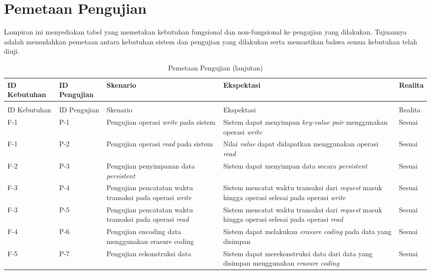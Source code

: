 \chapter{Pemetaan Pengujian}
\label{appendix:pemetaan-pengujian}

Lampiran ini menyediakan tabel yang memetakan kebutuhan fungsional dan non-fungsional ke pengujian yang dilakukan. Tujuannya adalah memudahkan pemetaan antara kebutuhan sistem dan pengujian yang dilakukan serta memastikan bahwa semua kebutuhan telah diuji.

\begin{longtable}{|l|l|p{3cm}|p{3cm}|l|}
\caption{Pemetaan Pengujian}
\label{tab:pemetaan-pengujian} \\
\hline
\rowcolor{black!10} ID Kebutuhan & ID Pengujian & Skenario & Ekspektasi & Realita \\ \hline
\endfirsthead

\caption[]{Pemetaan Pengujian (lanjutan)} \\
\hline
\rowcolor{black!10} ID Kebutuhan & ID Pengujian & Skenario & Ekspektasi & Realita \\ \hline
\endhead

F-1 & P-1 & Pengujian operasi \textit{write} pada sistem & Sistem dapat menyimpan \textit{key-value pair} menggunakan operasi \textit{write} & Sesuai \\ \hline
F-1 & P-2 & Pengujian operasi \textit{read} pada sistem & Nilai \textit{value} dapat didapatkan menggunakan operasi \textit{read} & Sesuai \\ \hline
F-2 & P-3 & Pengujian penyimpanan data \textit{persistent} & Sistem dapat menyimpan data secara \textit{persistent} & Sesuai \\ \hline
F-3 & P-4 & Pengujian pencatatan waktu transaksi pada operasi \textit{write} & Sistem mencatat waktu transaksi dari \textit{request} masuk hingga operasi selesai pada operasi \textit{write} & Sesuai \\ \hline
F-3 & P-5 & Pengujian pencatatan waktu transaksi pada operasi \textit{read} & Sistem mencatat waktu transaksi dari \textit{request} masuk hingga operasi selesai pada operasi \textit{read} & Sesuai \\ \hline
F-4 & P-6 & Pengujian encoding data menggunakan erasure coding & Sistem dapat melakukan \textit{erasure coding} pada data yang disimpan & Sesuai \\ \hline
F-5 & P-7 & Pengujian rekonstruksi data & Sistem dapat merekonstruksi data dari data yang disimpan menggunakan \textit{erasure coding} & Sesuai \\ \hline
\end{longtable}
